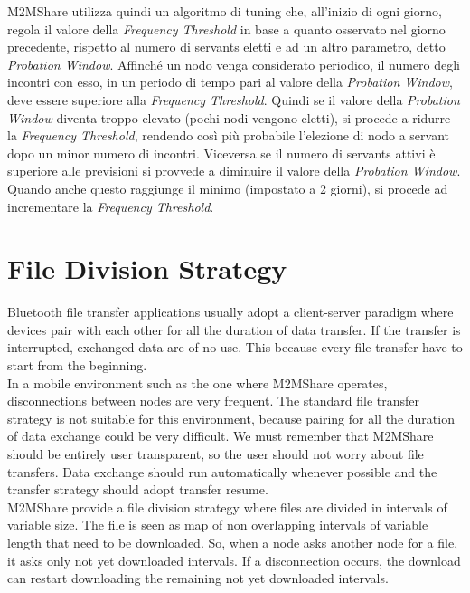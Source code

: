M2MShare utilizza quindi un algoritmo di tuning che, all'inizio di ogni giorno, regola il valore della \textit{Frequency Threshold} in base a quanto osservato nel giorno precedente, rispetto al numero di servants eletti e ad un altro parametro, detto \textit{Probation Window}. Affinché un nodo venga considerato periodico, il numero degli incontri con esso, in un periodo di tempo pari al valore della \textit{Probation Window}, deve essere superiore alla \textit{Frequency Threshold}. Quindi se il valore della \textit{Probation Window} diventa troppo elevato (pochi nodi vengono eletti), si procede a ridurre la \textit{Frequency Threshold}, rendendo così più probabile l'elezione di nodo a servant dopo un minor numero di incontri. Viceversa se il numero di servants attivi è superiore alle previsioni si provvede a diminuire il valore della \textit{Probation Window}. Quando anche questo raggiunge il minimo (impostato a 2 giorni), si procede ad incrementare la \textit{Frequency Threshold}.
\\



\section{File Division Strategy}
\label{descrFileDivisionStrategy}
Bluetooth file transfer applications usually adopt a client-server paradigm where devices pair with each other for all the duration of data transfer. If the transfer is interrupted, exchanged data are of no use. This because every file transfer have to start from the beginning. 
\\

In a mobile environment such as the one where M2MShare operates, disconnections between nodes are very frequent. The standard file transfer strategy is not suitable for this environment, because pairing for all the duration of data exchange could be very difficult. We must remember that M2MShare should be entirely user transparent, so the user should not worry about file transfers. Data exchange should run automatically whenever possible and the transfer strategy should adopt transfer resume.
\\

M2MShare provide a file division strategy where files are divided in intervals of variable size. The file is seen as map of non overlapping intervals of variable length that need to be downloaded. So, when a node asks another node for a file, it asks only not yet downloaded intervals. If a disconnection occurs, the download can restart downloading the remaining not yet downloaded intervals.
\\

